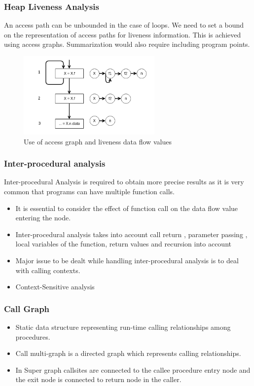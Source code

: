 \documentclass{beamer}
\begin{document}
\begin{frame}
\frametitle{Heap Liveness Analysis}

An access path can be unbounded in the case of loops. We need to set a bound on the representation of access paths for liveness information. This is achieved using access graphs. Summarization would also require including program points.

\begin{figure}[here]
	\begin{center}
		\includegraphics[width=7cm]{Figures/heap_summarization_liveness.png}
	\end{center}
	\caption{Use of access graph and liveness data flow values}
	\label{fig:accpath}
\end{figure}

\end{frame}



  \begin{frame}
  \frametitle{Inter-procedural analysis}
  Inter-procedural Analysis is required to obtain more precise results as it is very common that programs can have multiple function calls.
  \begin{itemize}
	\item It is essential to consider the effect of function call on the data flow value entering the node.
	\item Inter-procedural analysis takes into account call return , parameter passing , local variables of the function, return values and recursion into account
	\item Major issue to be dealt while handling inter-procedural analysis is to deal with calling contexts.
	\item Context-Sensitive analysis
	\end{itemize}
  \end{frame}
  
  \begin{frame}
  \frametitle{Call Graph}
  \begin{itemize}
  	\item Static data structure representing run-time calling relationships among procedures.
  	\item Call multi-graph is a directed graph which represents calling relationships.
  	\item In Super graph callsites are connected to the callee procedure entry node and the exit node is connected to return node in the caller.
  \end{itemize}

  \end{frame}
\end{document}
